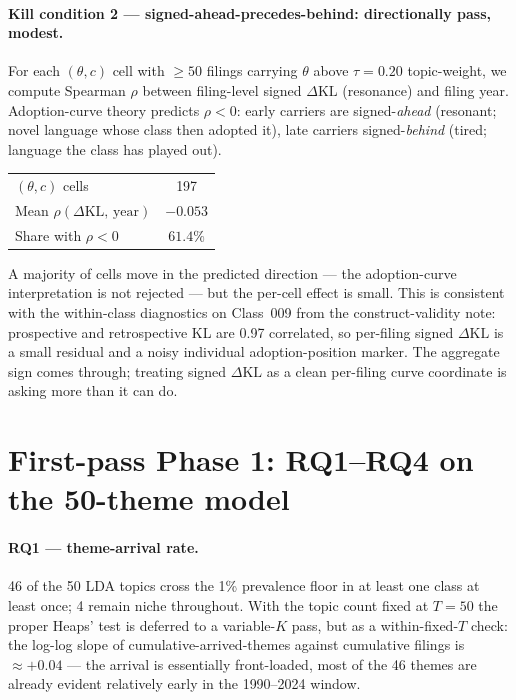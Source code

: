\documentclass[11pt]{article}
\begin{document}
\paragraph{Kill condition 2 --- signed-ahead-precedes-behind: directionally pass, modest.}
For each $(\theta, c)$ cell with $\geq 50$ filings carrying $\theta$ above
$\tau = 0.20$ topic-weight, we compute Spearman $\rho$ between filing-level
signed $\Delta\mathrm{KL}$ (resonance) and filing year. Adoption-curve theory
predicts $\rho < 0$: early carriers are signed-\emph{ahead} (resonant; novel
language whose class then adopted it), late carriers signed-\emph{behind} (tired;
language the class has played out).

\begin{table}[h]\centering\small
\begin{tabular}{lc}
\toprule
$(\theta, c)$ cells & 197 \\
Mean $\rho(\Delta\mathrm{KL},\,\text{year})$ & $-0.053$ \\
Share with $\rho<0$ & $\mathbf{61.4\%}$ \\
\bottomrule
\end{tabular}
\end{table}

\noindent A majority of cells move in the predicted direction --- the
adoption-curve interpretation is not rejected --- but the per-cell effect is
small. This is consistent with the within-class diagnostics on Class~009 from
the construct-validity note: prospective and retrospective KL are 0.97
correlated, so per-filing signed $\Delta\mathrm{KL}$ is a small residual and a
noisy individual adoption-position marker. The aggregate sign comes through;
treating signed $\Delta\mathrm{KL}$ as a clean per-filing curve coordinate is
asking more than it can do.

\section{First-pass Phase 1: RQ1--RQ4 on the 50-theme model}

\paragraph{RQ1 --- theme-arrival rate.} 46 of the 50 LDA topics cross the 1\%
prevalence floor in at least one class at least once; 4 remain niche
throughout. With the topic count fixed at $T = 50$ the proper Heaps' test is
deferred to a variable-$K$ pass, but as a within-fixed-$T$ check: the log-log
slope of cumulative-arrived-themes against cumulative filings is $\approx
+0.04$ --- the arrival is essentially front-loaded, most of the 46 themes are
already evident relatively early in the 1990--2024 window.
\end{document}
